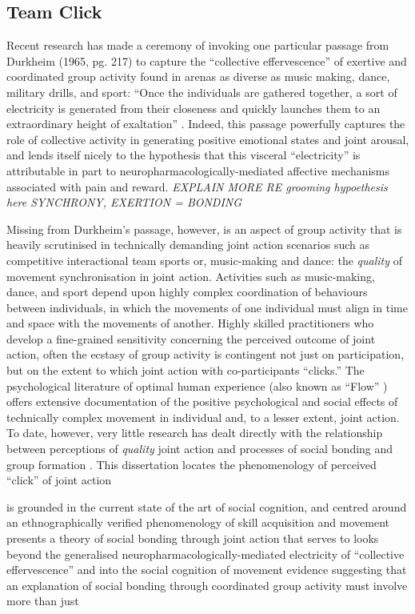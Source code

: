 \begin{CJK}{UTF8}{gbsn}
\subsection{Team Click}
Recent research has made a ceremony of invoking one particular passage from Durkheim (1965, pg. 217) to capture the ``collective effervescence'' of exertive and coordinated group activity found in arenas as diverse as music making, dance, military drills, and sport:  ``Once the individuals are gathered together, a sort of electricity is generated from their closeness and quickly launches them to an extraordinary height of exaltation'' \citep{McNeill1995,Konvalinka2011,Fischer2014,Mogan2017}. Indeed, this passage powerfully captures the role of collective activity in generating positive emotional states and joint arousal, and lends itself nicely to the hypothesis that this visceral ``electricity'' is attributable in part to neuropharmacologically-mediated affective mechanisms associated with pain and reward\citep{Dunbar2008,Cohen2009,Fischer2014,Launay2016}.   \textit{EXPLAIN MORE RE grooming hypoethesis here  SYNCHRONY, EXERTION = BONDING}

Missing from Durkheim's passage, however, is an aspect of group activity that is heavily scrutinised in
technically demanding joint action scenarios such as competitive interactional team sports or, music-making and dance: the \textit{quality} of movement synchronisation in joint action.  Activities such as music-making, dance, and sport depend upon highly complex coordination of behaviours between individuals, in which the movements of one individual must align in time and space with the movements of another.  Highly skilled practitioners who develop a fine-grained sensitivity concerning the perceived outcome of joint action, often the ecstasy of group activity is contingent not just on participation, but on the extent to which joint action with co-participants ``clicks.''   The psychological literature of optimal human experience (also known as ``Flow'' \citep{Csikszentmihalyi1992}) offers extensive documentation of the positive psychological and social effects of technically complex movement in individual and, to a lesser extent, joint action. To date, however, very little research has dealt directly with the relationship between perceptions of \textit{quality} joint action and processes of social bonding and group formation \citep[but see][]{Marsh2009}.
This dissertation locates the phenomenology of perceived ``click'' of joint action

is grounded in the current state of the art of social cognition, and centred around
an ethnographically verified phenomenology of skill acquisition and movement
presents a theory of social bonding through joint action that serves to
 looks beyond the generalised neuropharmacologically-mediated electricity of  ``collective effervescence'' and into the social cognition of movement
evidence suggesting that an explanation of social bonding through coordinated group activity must involve more than just




\end{CJK}
